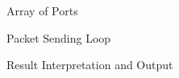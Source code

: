 \begin{figure}[p]
	\caption{\label{fig:ports} Array of Ports}
\end{figure}

\begin{figure}[p]
	\caption{\label{fig:loop} Packet Sending Loop}
\end{figure}

\begin{figure}[p]
	\caption{\label{fig:results} Result Interpretation and Output}
\end{figure}

